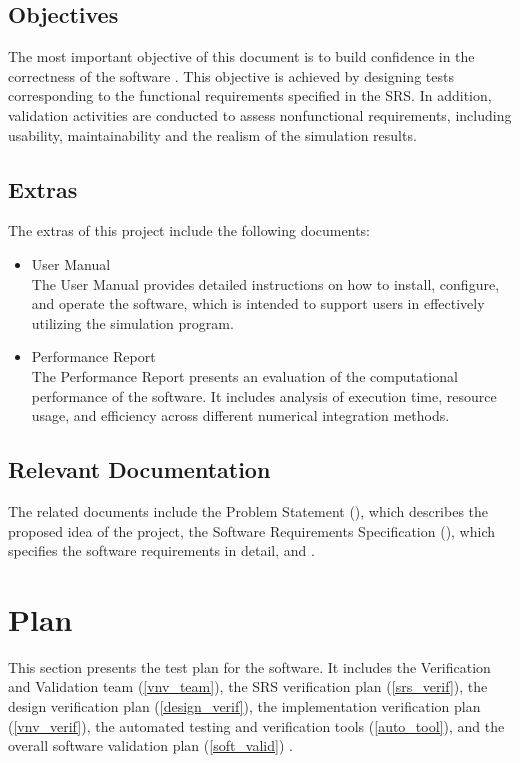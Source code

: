 \documentclass[12pt, titlepage]{article}
\begin{document}
\subsection{Objectives}

The most important objective of this document is to build confidence in the 
correctness of the software \progname{}. This objective is achieved by 
designing tests corresponding to the functional requirements specified in the 
SRS. In addition, validation activities are conducted to assess nonfunctional 
requirements, including usability, maintainability and the realism of the 
simulation results.

\subsection{Extras}

The extras of this project include the following documents:

\begin{itemize}
\item User Manual \\
The User Manual provides detailed instructions on how to install, configure, 
and operate the software, which is intended to support users in effectively 
utilizing the simulation program.

\item Performance Report \\
The Performance Report presents an evaluation of the computational performance 
of the software. It includes analysis of execution time, resource usage, 
and efficiency across different numerical integration methods.
\end{itemize}

\subsection{Relevant Documentation}

The related documents include the Problem Statement (\citet{ProblemStatement}), 
which describes the proposed idea of the project, the Software Requirements 
Specification (\citet{SRS}), which specifies the software requirements in 
detail, and \citet{MIS}.

\section{Plan}

This section presents the test plan for the software. It includes the 
Verification and Validation team (\ref{vnv_team}), the SRS verification 
plan (\ref{srs_verif}), the design verification plan (\ref{design_verif}), 
the implementation verification plan (\ref{vnv_verif}), the automated testing 
and verification tools (\ref{auto_tool}), and the overall software validation 
plan (\ref{soft_valid}) .
\end{document}
